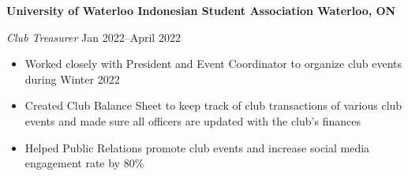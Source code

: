 \textbf{University of Waterloo Indonesian Student Association \hfill Waterloo, ON}\par
\textit{Club Treasurer} \hfill Jan 2022--April 2022

\begin{itemize}
    \item Worked closely with President and Event Coordinator to organize club events during Winter 2022
	\item Created Club Balance Sheet to keep track of club transactions of various club events and made sure all officers are updated with the club’s finances
	\item Helped Public Relations promote club events and increase social media engagement rate by 80\%
\end{itemize}
\vspace{0.1cm} \par
